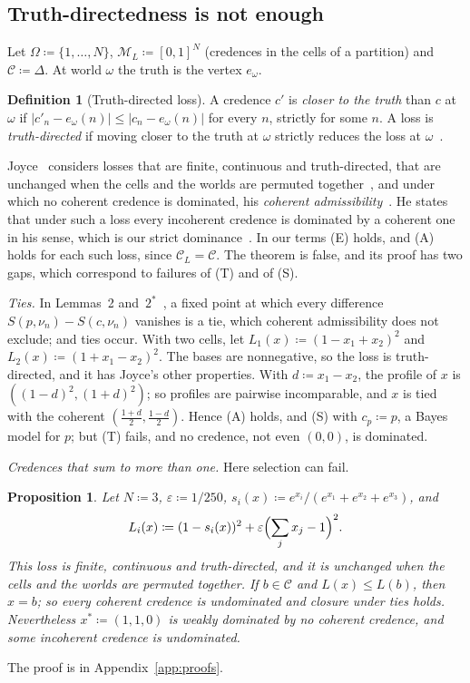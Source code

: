 \documentclass[11pt]{article}
\newtheorem{proposition}[theorem]{Proposition}
\theoremstyle{definition}
\newtheorem{definition}[theorem]{Definition}
\theoremstyle{remark}
\newcommand{\M}{\mathcal M}
\newcommand{\C}{\mathcal C}
\begin{document}
\subsection{Truth-directedness is not enough}\label{sec:joyce}
Let $\Omega\coloneqq\{1,\dots,N\}$, $\M_L\coloneqq[0,1]^N$ (credences in the cells of a partition) and $\C\coloneqq\Delta$. At world $\omega$ the truth is the vertex $e_\omega$.

\begin{definition}[Truth-directed loss]\label{def:truth-directed}
A credence $c'$ is \emph{closer to the truth} than $c$ at $\omega$ if $|c'_n-e_\omega(n)|\le|c_n-e_\omega(n)|$ for every $n$, strictly for some $n$. A loss is \emph{truth-directed} if moving closer to the truth at $\omega$ strictly reduces the loss at $\omega$~\cite[p.~269]{Joyce}.
\end{definition}

Joyce~\cite[Theorem~2, pp.~287--288]{Joyce} considers losses that are finite, continuous and truth-directed, that are unchanged when the cells and the worlds are permuted together~\cite[p.~271, n.~9]{Joyce}, and under which no coherent credence is dominated, his \emph{coherent admissibility}~\cite[p.~280]{Joyce}. He states that under such a loss every incoherent credence is dominated by a coherent one in his sense, which is our strict dominance~\cite[p.~267]{Joyce}. In our terms (E) holds, and (A) holds for each such loss, since $\C_L=\C$. The theorem is false, and its proof has two gaps, which correspond to failures of (T) and of (S).

\emph{Ties.} In Lemmas~2 and~$2^*$~\cite[pp.~295--296]{Joyce}, a fixed point at which every difference $S(p,\nu_n)-S(c,\nu_n)$ vanishes is a tie, which coherent admissibility does not exclude; and ties occur. With two cells, let $L_1(x)\coloneqq(1-x_1+x_2)^2$ and $L_2(x)\coloneqq(1+x_1-x_2)^2$. The bases are nonnegative, so the loss is truth-directed, and it has Joyce's other properties. With $d\coloneqq x_1-x_2$, the profile of $x$ is $((1-d)^2,(1+d)^2)$; so profiles are pairwise incomparable, and $x$ is tied with the coherent $(\frac{1+d}2,\frac{1-d}2)$. Hence (A) holds, and (S) with $c_p\coloneqq p$, a Bayes model for $p$; but (T) fails, and no credence, not even $(0,0)$, is dominated.

\emph{Credences that sum to more than one.} Here selection can fail.

\begin{proposition}\label{prop:joyce}
Let $N\coloneqq3$, $\varepsilon\coloneqq1/250$, $s_i(x)\coloneqq e^{x_i}/(e^{x_1}+e^{x_2}+e^{x_3})$, and
\[
L_i(x)\coloneqq(1-s_i(x))^2+\varepsilon\Bigl(\sum_jx_j-1\Bigr)^2.
\]
This loss is finite, continuous and truth-directed, and it is unchanged when the cells and the worlds are permuted together. If $b\in\C$ and $L(x)\le L(b)$, then $x=b$; so every coherent credence is undominated and closure under ties holds. Nevertheless $x^*\coloneqq(1,1,0)$ is weakly dominated by no coherent credence, and some incoherent credence is undominated.
\end{proposition}
The proof is in Appendix~\ref{app:proofs}.
\end{document}
